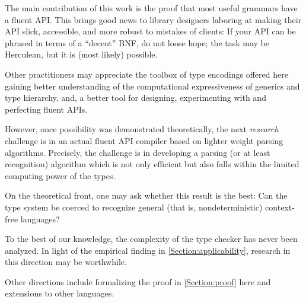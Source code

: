 The main contribution of this work is the proof that 
  most useful grammars have a fluent API\@.
This brings good news to library designers laboring
  at making their API slick, accessible, and more
  robust to mistakes of clients: 
If your API can be phrased in terms of a ``decent''
  BNF, do not loose hope; the task may be Herculean, but it is (most likely) possible. 

Other practitioners may appreciate the toolbox of type encodings offered here 
  gaining better understanding of the computational expressiveness of
  \Java generics and type hierarchy, and, a better tool
  for designing, experimenting with and perfecting fluent APIs.

However, once possibility was demonstrated theoretically, the next \emph{research} 
    challenge is in an actual fluent API compiler based on lighter weight
  parsing algorithms.
Precisely, the challenge 
  is in developing a parsing (or at least recognition) 
  algorithm which is not only efficient but also falls within the limited computing power of the \Java types. 

On the theoretical front, one may ask whether 
  this result is the best:
Can the \Java type system be coerced to recognize
  general (that is, nondeterministic) context-free languages?

To the best of our knowledge, 
  the complexity of the \Java type checker has never been analyzed. 
In light of the empirical finding in \cref{Section:applicability},
  research in this direction may be worthwhile. 

Other directions include 
  formalizing the proof in \cref{Section:proof} here and 
  extensions to other languages.
